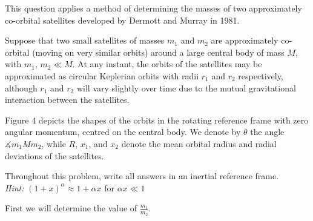 This question applies a method of determining the masses of two approximately
co-orbital satellites developed by Dermott and Murray in 1981.

Suppose that two small satellites of masses $m_1$ and $m_2$ are approximately
co-orbital (moving on very similar orbits) around a large central body of mass
$M$, with $m_1,\,m_2 \ll M$. At any instant, the orbits of the satellites may
be approximated as circular Keplerian orbits with radii $r_1$ and $r_2$
respectively, although $r_1$ and $r_2$ will vary slightly over time due to the
mutual gravitational interaction between the satellites.

Figure 4 depicts the shapes of the orbits in the rotating reference frame with
zero angular momentum, centred on the central body. We denote by $\theta$ the
angle $\measuredangle m_1 M m_2$, while $R$, $x_1$, and $x_2$ denote the mean
orbital radius and radial deviations of the satellites.

Throughout this problem, write all answers in an inertial reference frame.\\
\emph{Hint:} $(1+x)^\alpha \approx 1 + \alpha x$ for $\alpha x \ll 1$


First we will determine the value of $\frac{m_1}{m_2}$.

